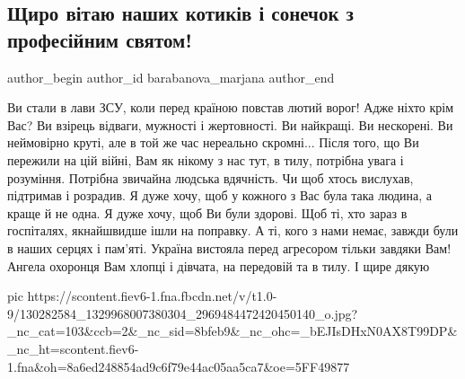  
 
 
 
 
\subsection{Щиро вітаю наших котиків і сонечок з професійним святом!}
\ifcmt
  author_begin
   author_id barabanova_marjana
  author_end
\fi


\obeycr
Ви стали в лави ЗСУ, коли перед країною повстав лютий ворог!
Адже ніхто крім Вас?
Ви взірець відваги, мужності і жертовності.
Ви найкращі.
Ви нескорені.
Ви неймовірно круті, але в той же час нереально скромні...
Після того, що Ви пережили на цій війні, Вам як нікому з нас тут, в тилу, потрібна увага і розуміння. 
Потрібна звичайна людська вдячність.
Чи щоб хтось вислухав, підтримав і розрадив.
Я дуже хочу, щоб у кожного з Вас була така людина, а краще й не одна.
Я дуже хочу, щоб Ви були здорові.
Щоб ті, хто зараз в госпіталях, якнайшвидше ішли на поправку.
А ті, кого з нами немає, завжди були в наших серцях і пам'яті.
Україна вистояла перед агресором тільки завдяки Вам!
Ангела охоронця Вам хлопці і дівчата, на передовій та в тилу.
І щире дякую 
\restorecr

\ifcmt
pic https://scontent.fiev6-1.fna.fbcdn.net/v/t1.0-9/130282584_1329968007380304_2969484472420450140_o.jpg?_nc_cat=103&ccb=2&_nc_sid=8bfeb9&_nc_ohc=_bEJIsDHxN0AX8T99DP&_nc_ht=scontent.fiev6-1.fna&oh=8a6ed248854ad9c6f79e44ac05aa5ca7&oe=5FF49877
\fi
